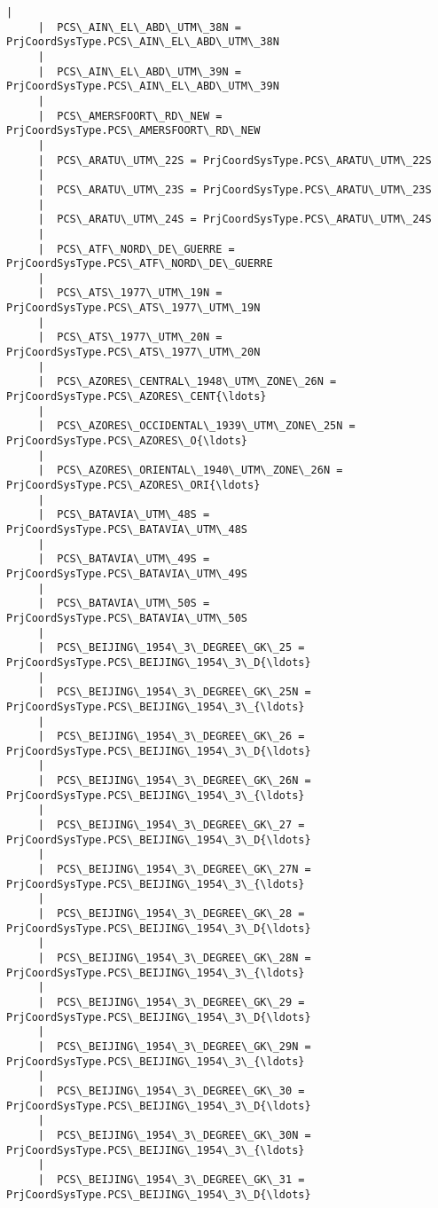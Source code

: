 \documentclass[11pt]{article}
\begin{document}
\begin{Verbatim}[commandchars=\\\{\}]
     |  
     |  PCS\_AIN\_EL\_ABD\_UTM\_38N = PrjCoordSysType.PCS\_AIN\_EL\_ABD\_UTM\_38N
     |  
     |  PCS\_AIN\_EL\_ABD\_UTM\_39N = PrjCoordSysType.PCS\_AIN\_EL\_ABD\_UTM\_39N
     |  
     |  PCS\_AMERSFOORT\_RD\_NEW = PrjCoordSysType.PCS\_AMERSFOORT\_RD\_NEW
     |  
     |  PCS\_ARATU\_UTM\_22S = PrjCoordSysType.PCS\_ARATU\_UTM\_22S
     |  
     |  PCS\_ARATU\_UTM\_23S = PrjCoordSysType.PCS\_ARATU\_UTM\_23S
     |  
     |  PCS\_ARATU\_UTM\_24S = PrjCoordSysType.PCS\_ARATU\_UTM\_24S
     |  
     |  PCS\_ATF\_NORD\_DE\_GUERRE = PrjCoordSysType.PCS\_ATF\_NORD\_DE\_GUERRE
     |  
     |  PCS\_ATS\_1977\_UTM\_19N = PrjCoordSysType.PCS\_ATS\_1977\_UTM\_19N
     |  
     |  PCS\_ATS\_1977\_UTM\_20N = PrjCoordSysType.PCS\_ATS\_1977\_UTM\_20N
     |  
     |  PCS\_AZORES\_CENTRAL\_1948\_UTM\_ZONE\_26N = PrjCoordSysType.PCS\_AZORES\_CENT{\ldots}
     |  
     |  PCS\_AZORES\_OCCIDENTAL\_1939\_UTM\_ZONE\_25N = PrjCoordSysType.PCS\_AZORES\_O{\ldots}
     |  
     |  PCS\_AZORES\_ORIENTAL\_1940\_UTM\_ZONE\_26N = PrjCoordSysType.PCS\_AZORES\_ORI{\ldots}
     |  
     |  PCS\_BATAVIA\_UTM\_48S = PrjCoordSysType.PCS\_BATAVIA\_UTM\_48S
     |  
     |  PCS\_BATAVIA\_UTM\_49S = PrjCoordSysType.PCS\_BATAVIA\_UTM\_49S
     |  
     |  PCS\_BATAVIA\_UTM\_50S = PrjCoordSysType.PCS\_BATAVIA\_UTM\_50S
     |  
     |  PCS\_BEIJING\_1954\_3\_DEGREE\_GK\_25 = PrjCoordSysType.PCS\_BEIJING\_1954\_3\_D{\ldots}
     |  
     |  PCS\_BEIJING\_1954\_3\_DEGREE\_GK\_25N = PrjCoordSysType.PCS\_BEIJING\_1954\_3\_{\ldots}
     |  
     |  PCS\_BEIJING\_1954\_3\_DEGREE\_GK\_26 = PrjCoordSysType.PCS\_BEIJING\_1954\_3\_D{\ldots}
     |  
     |  PCS\_BEIJING\_1954\_3\_DEGREE\_GK\_26N = PrjCoordSysType.PCS\_BEIJING\_1954\_3\_{\ldots}
     |  
     |  PCS\_BEIJING\_1954\_3\_DEGREE\_GK\_27 = PrjCoordSysType.PCS\_BEIJING\_1954\_3\_D{\ldots}
     |  
     |  PCS\_BEIJING\_1954\_3\_DEGREE\_GK\_27N = PrjCoordSysType.PCS\_BEIJING\_1954\_3\_{\ldots}
     |  
     |  PCS\_BEIJING\_1954\_3\_DEGREE\_GK\_28 = PrjCoordSysType.PCS\_BEIJING\_1954\_3\_D{\ldots}
     |  
     |  PCS\_BEIJING\_1954\_3\_DEGREE\_GK\_28N = PrjCoordSysType.PCS\_BEIJING\_1954\_3\_{\ldots}
     |  
     |  PCS\_BEIJING\_1954\_3\_DEGREE\_GK\_29 = PrjCoordSysType.PCS\_BEIJING\_1954\_3\_D{\ldots}
     |  
     |  PCS\_BEIJING\_1954\_3\_DEGREE\_GK\_29N = PrjCoordSysType.PCS\_BEIJING\_1954\_3\_{\ldots}
     |  
     |  PCS\_BEIJING\_1954\_3\_DEGREE\_GK\_30 = PrjCoordSysType.PCS\_BEIJING\_1954\_3\_D{\ldots}
     |  
     |  PCS\_BEIJING\_1954\_3\_DEGREE\_GK\_30N = PrjCoordSysType.PCS\_BEIJING\_1954\_3\_{\ldots}
     |  
     |  PCS\_BEIJING\_1954\_3\_DEGREE\_GK\_31 = PrjCoordSysType.PCS\_BEIJING\_1954\_3\_D{\ldots}

\end{Verbatim}
\end{document}
